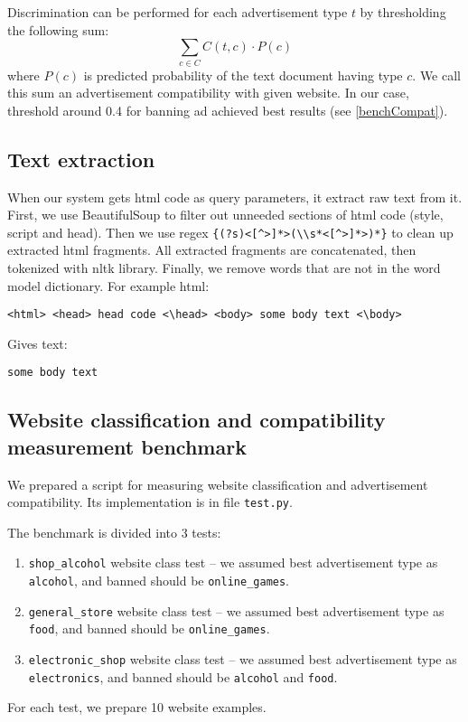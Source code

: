 \documentclass[a4paper]{article}
\begin{document}
Discrimination can be performed for each advertisement type $t$
by thresholding the following sum:
\begin{equation}
    \sum_{c\in{C}} {C(t, c) \cdot P(c)}
\end{equation}
where $P(c)$ is predicted probability of the text document having type $c$.
We call this sum an advertisement compatibility with given website.
In our case, threshold around 0.4 for banning ad achieved best results (see \ref{benchCompat}).

\subsection{Text extraction}
\label{extraction}

When our system gets html code as query parameters, it extract raw text from it.
First, we use BeautifulSoup to filter out unneeded sections of html code (style, script and head).
Then we use regex \verb|{(?s)<[^>]*>(\\s*<[^>]*>)*}| to clean up extracted html fragments.
All extracted fragments are concatenated, then tokenized with nltk library.
Finally, we remove words that are not in the word model dictionary.
For example html:
\begin{verbatim}
<html> <head> head code <\head> <body> some body text <\body>
\end{verbatim}
Gives text:
\begin{verbatim}
some body text
\end{verbatim}


\subsection{Website classification and compatibility measurement benchmark}
\label{bench}

We prepared a script for measuring website classification and
advertisement compatibility.
Its implementation is in file \texttt{test.py}.

The benchmark is divided into 3 tests:
\begin{enumerate}
    \item \texttt{shop\_alcohol} website class test --
        we assumed best advertisement type as \texttt{alcohol},
        and banned should be \texttt{online\_games}.
    \item \texttt{general\_store} website class test --
        we assumed best advertisement type as \texttt{food},
        and banned should be \texttt{online\_games}.
    \item \texttt{electronic\_shop} website class test --
        we assumed best advertisement type as \texttt{electronics},
        and banned should be \texttt{alcohol} and \texttt{food}.
\end{enumerate}
For each test, we prepare 10 website examples.
\end{document}
